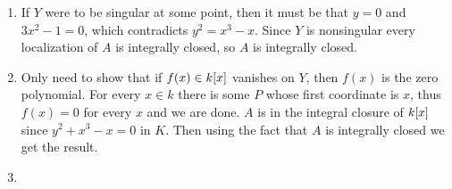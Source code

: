 \documentclass{note}
\begin{document}
\Ex
\begin{enumerate}
  \item If $Y$ were to be singular at some point, then it must be that
        $y = 0$ and $3x^2-1 = 0$, which contradicts $y^2 = x^3 - x$. Since
        $Y$ is nonsingular every localization of $A$ is integrally closed,
        so $A$ is integrally closed.
  \item Only need to show that if $f(x) \in
          \polynomials{k}{x}$ vanishes on $Y$, then $f(x)$ is the zero polynomial. For
        every $x\in k$ there is some $P$ whose first coordinate is $x$, thus $f(x) = 0$
        for every $x$ and we are done. $A$ is in the integral closure of
        $\polynomials{k}{x}$ since $y^2 + x^3 - x = 0$ in $K$. Then using the fact that
        $A$ is integrally closed we get the result.
  \item
\end{enumerate}
\end{document}
